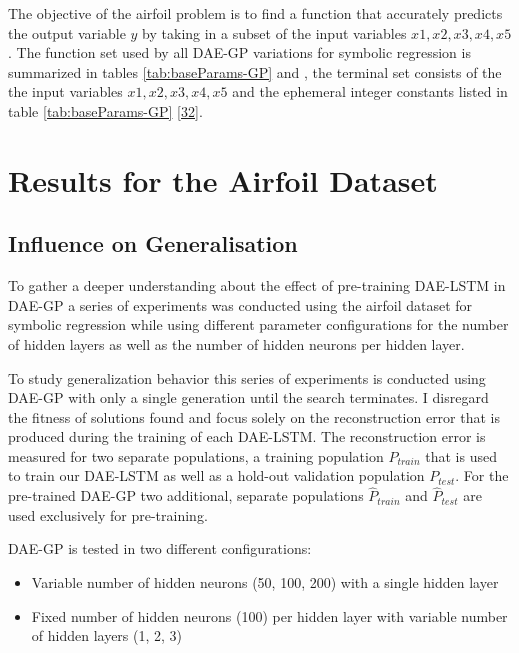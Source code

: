 \documentclass[
  11pt,
]{article}
\providecommand{\tightlist}{%
  \setlength{\itemsep}{0pt}\setlength{\parskip}{0pt}}
\begin{document}
The objective of the airfoil problem is to find a function that accurately predicts the output variable \(y\) by taking in a subset of the input variables \(x1,x2,x3,x4,x5\). The function set used by all DAE-GP variations for symbolic regression is summarized in tables \ref{tab:baseParams-GP} and , the terminal set consists of the the input variables \(x1,x2,x3,x4,x5\) and the ephemeral integer constants listed in table \ref{tab:baseParams-GP} {[}\protect\hyperlink{ref-dae-gp_2022_symreg}{32}{]}.

\hypertarget{results-for-the-airfoil-dataset}{%
\section{Results for the Airfoil Dataset}\label{results-for-the-airfoil-dataset}}

\hypertarget{influence-on-generalisation}{%
\subsection{Influence on Generalisation}\label{influence-on-generalisation}}

To gather a deeper understanding about the effect of pre-training DAE-LSTM in DAE-GP a series of experiments was conducted using the airfoil dataset for symbolic regression while using different parameter configurations for the number of hidden layers as well as the number of hidden neurons per hidden layer.

To study generalization behavior this series of experiments is conducted using DAE-GP with only a single generation until the search terminates. I disregard the fitness of solutions found and focus solely on the reconstruction error that is produced during the training of each DAE-LSTM. The reconstruction error is measured for two separate populations, a training population \(P_{train}\) that is used to train our DAE-LSTM as well as a hold-out validation population \(P_{test}\). For the pre-trained DAE-GP two additional, separate populations \(\hat{P}_{train}\) and \(\hat{P}_{test}\) are used exclusively for pre-training.

DAE-GP is tested in two different configurations:

\begin{itemize}
\tightlist
\item
  Variable number of hidden neurons (50, 100, 200) with a single hidden layer
\item
  Fixed number of hidden neurons (100) per hidden layer with variable number of hidden layers (1, 2, 3)
\end{itemize}
\end{document}
